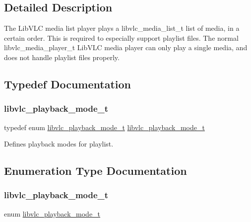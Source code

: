 \subsection{Detailed Description}
The Lib\+V\+LC media list player plays a libvlc\+\_\+media\+\_\+list\+\_\+t list of media, in a certain order. This is required to especially support playlist files. The normal libvlc\+\_\+media\+\_\+player\+\_\+t Lib\+V\+LC media player can only play a single media, and does not handle playlist files properly. 

\subsection{Typedef Documentation}
\mbox{\label{group__libvlc__media__list__player_gac1548e6f3b89aaa57779225fef404c2c}} 
\subsubsection{\texorpdfstring{libvlc\+\_\+playback\+\_\+mode\+\_\+t}{libvlc\_playback\_mode\_t}}
{\footnotesize\ttfamily typedef enum \hyperlink{group__libvlc__media__list__player_ga1f0139f9220d7578fab37a3c1a74af9c}{libvlc\+\_\+playback\+\_\+mode\+\_\+t}  \hyperlink{group__libvlc__media__list__player_ga1f0139f9220d7578fab37a3c1a74af9c}{libvlc\+\_\+playback\+\_\+mode\+\_\+t}}

Defines playback modes for playlist. 

\subsection{Enumeration Type Documentation}
\mbox{\label{group__libvlc__media__list__player_ga1f0139f9220d7578fab37a3c1a74af9c}} 
\subsubsection{\texorpdfstring{libvlc\+\_\+playback\+\_\+mode\+\_\+t}{libvlc\_playback\_mode\_t}}
{\footnotesize\ttfamily enum \hyperlink{group__libvlc__media__list__player_ga1f0139f9220d7578fab37a3c1a74af9c}{libvlc\+\_\+playback\+\_\+mode\+\_\+t}}

